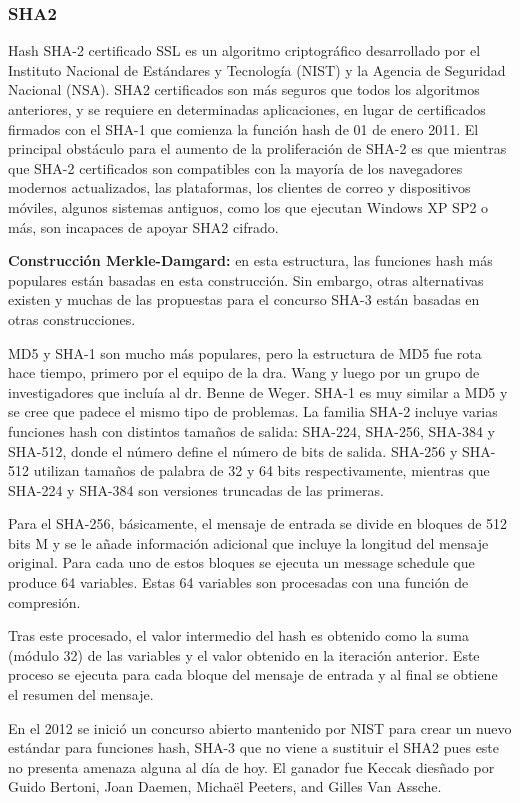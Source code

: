\documentclass[spanish]{article}
\begin{document}
\subsubsection{SHA2}
Hash SHA-2 certificado SSL es un algoritmo criptográfico desarrollado por el Instituto Nacional de Estándares y Tecnología (NIST) y la Agencia de Seguridad Nacional (NSA). SHA2 certificados son más seguros que todos los algoritmos anteriores, y se requiere en determinadas aplicaciones, en lugar de certificados firmados con el SHA-1 que comienza la función hash de 01 de enero 2011.
El principal obstáculo para el aumento de la proliferación de SHA-2 es que mientras que SHA-2 certificados son compatibles con la mayoría de los navegadores modernos actualizados, las plataformas, los clientes de correo y dispositivos móviles, algunos sistemas antiguos, como los que ejecutan Windows XP SP2 o más, son incapaces de apoyar SHA2 cifrado.


\textbf{Construcción Merkle-Damgard:} en esta estructura, las funciones hash más populares están basadas en esta construcción. Sin embargo, otras alternativas existen y muchas de las propuestas para el concurso SHA-3 están basadas en otras construcciones.

MD5 y SHA-1 son mucho más populares, pero la estructura de MD5 fue rota hace tiempo, primero por el equipo de la dra. Wang y luego por un grupo de investigadores que incluía al dr. Benne de Weger. SHA-1 es muy similar a MD5 y se cree que padece el mismo tipo de problemas. La familia SHA-2 incluye varias funciones hash con distintos tamaños de salida: SHA-224, SHA-256, SHA-384 y SHA-512, donde el número define el número de bits de salida.
SHA-256 y SHA-512 utilizan tamaños de palabra de 32 y 64 bits respectivamente, mientras que SHA-224 y SHA-384 son versiones truncadas de las primeras. 

Para el SHA-256, básicamente, el mensaje de entrada se divide en bloques de 512 bits M y se le añade información adicional que incluye la longitud del mensaje original. Para cada uno de estos bloques se ejecuta un message schedule que produce 64 variables. Estas 64 variables son procesadas con una función de compresión.

Tras este procesado, el valor intermedio del hash es obtenido como la suma (módulo 32) de las variables y el valor obtenido en la iteración anterior. Este proceso se ejecuta para cada bloque del mensaje de entrada y al final se obtiene el resumen del mensaje.

En el 2012 se inició un concurso abierto mantenido por NIST para crear un nuevo estándar para funciones hash, SHA-3 que no viene a sustituir el SHA2 pues este no presenta amenaza alguna al día de hoy. El ganador fue  Keccak diesñado por Guido Bertoni, Joan Daemen, Michaël Peeters, and Gilles Van Assche.
\end{document}

